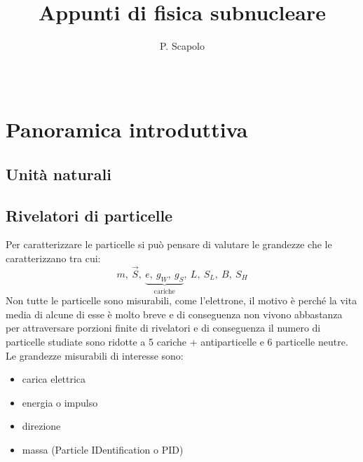 \documentclass[12pt]{book}
\title{Appunti di fisica subnucleare}
\author{P. Scapolo}
\date{\ }
\begin{document}
\maketitle[toc=on]
\clearpage
\pagestyle{bigmargin}


\chapter{Panoramica introduttiva}

\section{Unità naturali}

\section{Rivelatori di particelle}
\toc
Per caratterizzare le particelle si può pensare di valutare le grandezze che le caratterizzano tra cui:
\begin{equation}
	m, \ \vec S , \ \underbrace{e,\ g_{W}, \ g_{S}}_{\text{cariche}}, 	\ L, \ S_L, \ B, \ S_H
\end{equation}
Non tutte le particelle sono misurabili, come l'elettrone, il motivo è perché la vita media di alcune di esse è molto breve e di conseguenza non vivono abbastanza per attraversare porzioni finite di rivelatori e di conseguenza il numero di particelle studiate sono ridotte a 5 cariche + antiparticelle e 6 particelle neutre. Le grandezze misurabili di interesse sono:
\begin{itemize}
	\item carica elettrica
	\item energia o impulso
	\item direzione
	\item massa (Particle IDentification o PID)
\end{itemize}
\end{document}
